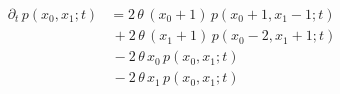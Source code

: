 \documentclass[10pt]{article}
\begin{document}
\begin{align*}\partial_t \,p(x_0, x_1; t) &= 2\,\theta\,(x_0+1)\,p(x_0+1, x_1-1;t)\\
&\,+ 2\,\theta\,(x_1+1)\,p(x_0-2, x_1+1;t)\\
&\,- 2\,\theta\,x_0\,p(x_0, x_1;t)\\
&\,- 2\,\theta\,x_1\,p(x_0, x_1;t)\end{align*}
\end{document}
